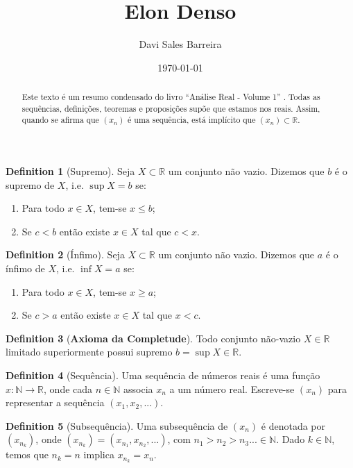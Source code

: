 \documentclass[10pt]{article}
\title{Elon Denso}
\author{Davi Sales Barreira}
\date{\today}
\theoremstyle{definition}
\newtheorem{definition}{Definition}[section]
\begin{document}
\maketitle
\begin{abstract}
	Este texto é um resumo condensado do livro ``Análise Real - Volume 1''
	\citep{lima2004analise}. Todas as sequências, definições, teoremas e proposições
	supõe que estamos nos reais. Assim, quando se afirma que $(x_n)$ é uma sequência,
	está implícito que $(x_n) \subset \mathbb R$.
\end{abstract}
\begin{definition}[Supremo]
	Seja $X \subset \mathbb R$ um conjunto não vazio. Dizemos que
	$b$ é o supremo de $X$, i.e. $\sup X = b$ se:
	\begin{enumerate}
		\item Para todo $x \in X$, tem-se $x \leq b$;
		\item Se $c<b$ então existe $x \in X$ tal que $c<x$.
	\end{enumerate}
\end{definition}

\begin{definition}[Ínfimo]
	Seja $X \subset \mathbb R$ um conjunto não vazio. Dizemos que
	$a$ é o ínfimo de $X$, i.e. $\inf X = a$ se:
	\begin{enumerate}
		\item Para todo $x \in X$, tem-se $x \geq a$;
		\item Se $c>a$ então existe $x \in X$ tal que $x<c$.
	\end{enumerate}
\end{definition}

\begin{definition}[\textbf{Axioma da Completude}]
	Todo conjunto não-vazio $X \in \mathbb R$ limitado superiormente possui
	supremo $b = \sup X \in \mathbb R$.
\end{definition}

\begin{definition}[Sequência]
	Uma sequência de números reais é uma função $x: \mathbb N \to \mathbb R$,
	onde cada $n \in \mathbb N$ associa $x_n$ a um número real. Escreve-se
	$(x_n)$ para representar a sequência $(x_1,x_2,...)$.
\end{definition}

\begin{definition}[Subsequência]
	Uma subsequência de $(x_n)$ é denotada por $(x_{n_k})$, onde
	$(x_{n_k}) = (x_{n_1},x_{n_2},...)$, com $n_1 > n_2 > n_3 ... \in \mathbb N$.
	Dado $k \in \mathbb N$, temos que $n_k = n$ implica $x_{n_k} = x_n$.
\end{definition}
\end{document}
